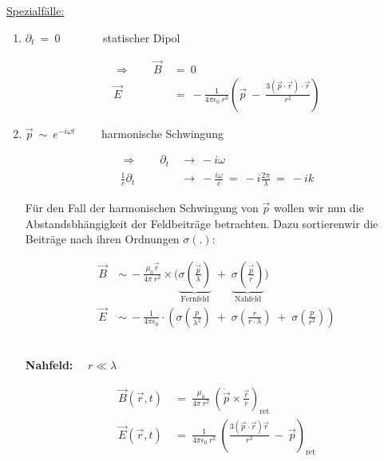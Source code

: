 \ \\
\ \\
\underline{Spezialfälle:}
\begin{enumerate}[label=\roman*)]
	\item $\partial_t  \ = \ 0 \quad\ \; \qquad$ statischer Dipol
	
	\begin{align*}
	\Rightarrow \qquad \vec{B}  \ &= \ 0\\
	\vec{E} \ &= \ - \frac{1}{4\pi\epsilon_0 \ r^3}\left(\vec{p} \ - \ \frac{3(\vec{p}\cdot\vec{r})\cdot\vec{r}}{r^2}\right)
	\end{align*}
	
	\item $\vec{p} \ \sim \ e^{-i\omega t} \qquad$ harmonische Schwingung
	
	\begin{align*}
	\Rightarrow \qquad \partial_t \ &\rightarrow \ -i\omega\\
	\frac{1}{c}\partial_t \ &\rightarrow \ - \frac{i\omega}{c}  \ = \ -i \frac{2\pi}{\lambda}  \ = \ -ik
	\end{align*}
	
	Für den Fall der harmonischen Schwingung von $\vec{p}$ wollen wir nun die Abstandsbhängigkeit der Feldbeiträge betrachten. Dazu \grqq sortieren\grqq   wir die Beiträge nach ihren Ordnungen $\sigma(.)$:
	
	\begin{align*}
	\vec{B} \ &\sim \ - \frac{\mu_0 \vec{r}}{4\pi \ r^2} \times \Bigg(\underbrace{\sigma\left(\frac{\dot{\vec{p}}}{\lambda}\right)}_{\text{Fernfeld}} \; + \; \underbrace{\sigma\left(\frac{\dot{\vec{p}}}{r}\right)}_{\text{Nahfeld}}\Bigg)\\
	\vec{E} \ &\sim \ - \frac{1}{4\pi\epsilon_0} \cdot \left(\sigma\left(\frac{p}{\lambda^2}\right) \; + \; \sigma\left(\frac{r}{r \cdot \lambda}\right) \; + \; \sigma\left(\frac{p}{r^2}\right)\right)
	\end{align*}
	
	\ \\
	\textbf{Nahfeld:} $\quad r \ll \lambda$
	
	\begin{align*}
	\vec{B}(\vec{r},t)  \ &= \ \frac{\mu_0}{4\pi\ r^2} \ \left(\dot{\vec{p}} \times \frac{\vec{r}}{r}\right)_{\text{ret}}\\
	\vec{E}(\vec{r},t)  \ &= \ \frac{1}{4\pi\epsilon_0 \ r^2} \ \left(\frac{3(\vec{p}\cdot\vec{r})\vec{r}}{r^2} \ - \ \vec{p}\right)_{\text{ret}} 
	\end{align*}
	

\end{enumerate}
